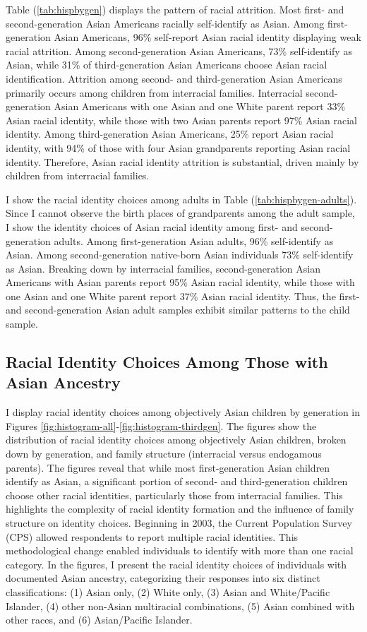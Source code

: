 Table (\ref{tab:hispbygen}) displays the pattern of racial attrition. Most first- and second-generation Asian Americans racially self-identify as Asian. Among first-generation Asian Americans, 96\% self-report Asian racial identity displaying weak racial attrition. Among second-generation Asian Americans, 73\% self-identify as Asian, while 31\% of third-generation Asian Americans choose Asian racial identification. Attrition among second- and third-generation Asian Americans primarily occurs among children from interracial families. Interracial second-generation Asian Americans with one Asian and one White parent report 33\% Asian racial identity, while those with two Asian parents report 97\% Asian racial identity. Among third-generation Asian Americans, 25\% report Asian racial identity, with 94\% of those with four Asian grandparents reporting Asian racial identity. Therefore, Asian racial identity attrition is substantial, driven mainly by children from interracial families.

I show the racial identity choices among adults in Table (\ref{tab:hispbygen-adults}). Since I cannot observe the birth places of grandparents among the adult sample, I show the identity choices of Asian racial identity among first- and second-generation adults. Among first-generation Asian adults, 96\% self-identify as Asian. Among second-generation native-born Asian individuals 73\%  self-identify as Asian. Breaking down by interracial families, second-generation Asian Americans with Asian parents report 95\% Asian racial identity, while those with one Asian and one White parent report 37\% Asian racial identity. Thus, the first- and second-generation Asian adult samples exhibit similar patterns to the child sample.

\subsection{Racial Identity Choices Among Those with Asian Ancestry}
I display racial identity choices among objectively Asian children by generation in Figures \ref{fig:histogram-all}-\ref{fig:histogram-thirdgen}. The figures show the distribution of racial identity choices among objectively Asian children, broken down by generation, and family structure (interracial versus endogamous parents). The figures reveal that while most first-generation Asian children identify as Asian, a significant portion of second- and third-generation children choose other racial identities, particularly those from interracial families. This highlights the complexity of racial identity formation and the influence of family structure on identity choices. Beginning in 2003, the Current Population Survey (CPS) allowed respondents to report multiple racial identities. This methodological change enabled individuals to identify with more than one racial category. In the figures, I present the racial identity choices of individuals with documented Asian ancestry, categorizing their responses into six distinct classifications: (1) Asian only, (2) White only, (3) Asian and White/Pacific Islander, (4) other non-Asian multiracial combinations, (5) Asian combined with other races, and (6) Asian/Pacific Islander.


